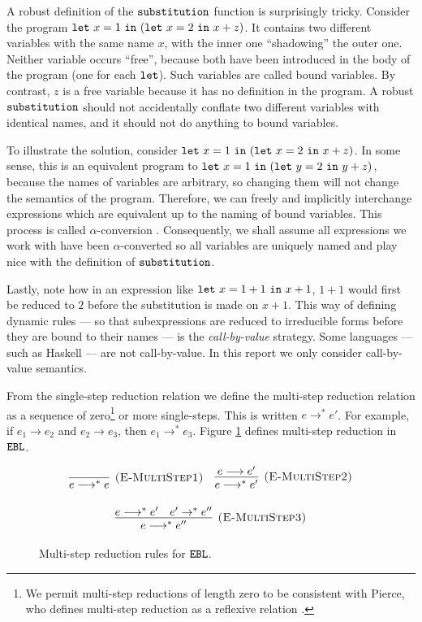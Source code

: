 A robust definition of the $\mathtt{substitution}$ function is surprisingly tricky. Consider the program $\mathtt{let}~ x = 1~\mathtt{in}~ (\mathtt{let}~ x = 2~\mathtt{in}~ x+z)$. It contains two different variables with the same name $x$, with the inner one ``shadowing'' the outer one. Neither variable occurs ``free'', because both have been introduced in the body of the program (one for each $\mathtt{let}$). Such variables are called bound variables. By contrast, $z$ is a free variable because it has no definition in the program. A robust $\mathtt{substitution}$ should not accidentally conflate two different variables with identical names, and it should not do anything to bound variables.

To illustrate the solution, consider $\mathtt{let}~ x = 1~\mathtt{in}~ (\mathtt{let}~ x = 2~\mathtt{in}~ x+z)$. In some sense, this is an equivalent program to $\mathtt{let}~ x = 1~\mathtt{in}~ (\mathtt{let}~ y = 2~\mathtt{in}~ y+z)$, because the names of variables are arbitrary, so changing them will not change the semantics of the program. Therefore, we can freely and implicitly interchange expressions which are equivalent up to the naming of bound variables. This process is called $\alpha$-conversion \cite[p. 71]{tapl}. Consequently, we shall assume all expressions we work with have been $\alpha$-converted so all variables are uniquely named and play nice with the definition of $\mathtt{substitution}$.

Lastly, note how in an expression like $\mathtt{let}~ x = 1+1~\mathtt{in}~ x+1$, $1+1$ would first be reduced to $2$ before the substitution is made on $x+1$. This way of defining dynamic rules --- so that subexpressions are reduced to irreducible forms before they are bound to their names --- is the \textit{call-by-value} strategy. Some languages --- such as Haskell --- are not call-by-value. In this report we only consider call-by-value semantics.

From the single-step reduction relation we define the multi-step reduction relation as a sequence of zero\footnote{We permit multi-step reductions of length zero to be consistent with Pierce, who defines multi-step reduction as a reflexive relation \cite[p. 39]{tapl}.} or more single-steps. This is written $e \longrightarrow^* e'$. For example, if $e_1 \longrightarrow e_2$ and $e_2 \longrightarrow e_3$, then $e_1 \longrightarrow^* e_3$. Figure \ref{fig:ebl_dyn_multistep} defines multi-step reduction in $\mathtt{EBL}$.

\begin{figure}[h]

\noindent
{}

\[
\begin{array}{c}

\infer[\textsc{(E-MultiStep1)}]
	{ e \longrightarrow^{*}  e}
	{}
~~~
\infer[\textsc{(E-MultiStep2)}]
	{ e \longrightarrow^{*}  e'}
	{ e \longrightarrow  e'} \\[3ex]
	
\infer[\textsc{(E-MultiStep3)}]
	{e \longrightarrow^{*}  e''}
	{ e \longrightarrow^{*}  e' &  e' \rightarrow^{*}  e''}
\end{array}
\]
\vspace{-12pt}
\caption{Multi-step reduction rules for $\mathtt{EBL}$.}
\label{fig:ebl_dyn_multistep}
\end{figure}

